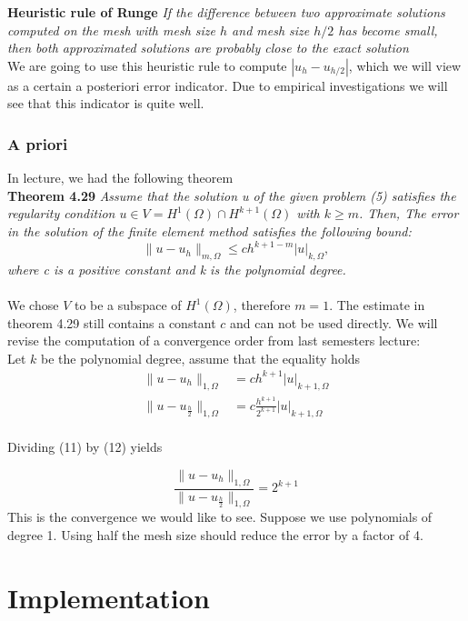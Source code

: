 \documentclass[a4paper,12pt]{report}
\begin{document}
\textbf{Heuristic rule of Runge}
\textit{If the difference between two approximate solutions computed on the mesh with mesh size $h$ and mesh size $h/2$ has become small, then both approximated solutions are probably close to the exact solution}
\\

We are going to use this heuristic rule to compute $ | u_{h} - u_{h/2} | $, which we will view as a certain a posteriori error indicator. Due to empirical investigations we will see that this indicator is quite well.


\subsection{A priori}
In lecture, we had the following theorem \\
\textbf{Theorem 4.29} \textit{Assume that the solution u of the given problem (5) satisfies
the regularity condition $u \in V=H^1(\Omega) \cap H^{k+1}(\Omega)$ with $k \geq m$. Then, The error in the solution of the finite element method satisfies the following bound:}
\[\|u-u_h\|_{m,\Omega}\leq ch^{k+1-m}|u|_{k,\Omega},\]
\textit{where c is a positive constant and k is the polynomial degree.}\\
\\
We chose $V$ to be a subspace of $H^1(\Omega)$, therefore $m=1$. The estimate in theorem 4.29 still contains a constant $c$ and can not be used directly. We will revise the computation of a convergence order from last semesters lecture:\\
Let $k$ be the polynomial degree, assume that the equality holds
\begin{align}
\|u-u_h\|_{1,\Omega}&= ch^{k+1}|u|_{k+1,\Omega} \\
\|u-u_{\frac{h}{2}}\|_{1,\Omega}&= c\frac{h^{k+1}}{2^{k+1}}|u|_{{k+1},\Omega}
\end{align}
\\
Dividing (11) by (12) yields 

\[\frac{\|u-u_h\|_{1,\Omega}}{\|u-u_{\frac{h}{2}}\|_{1,\Omega}}= 2^{k+1}\]
This is the convergence we would like to see. Suppose we use polynomials of degree 1. Using half the mesh size should reduce the error by a factor of 4.


\chapter[Implementation]{Implementation} 
\newpage

\end{document}
